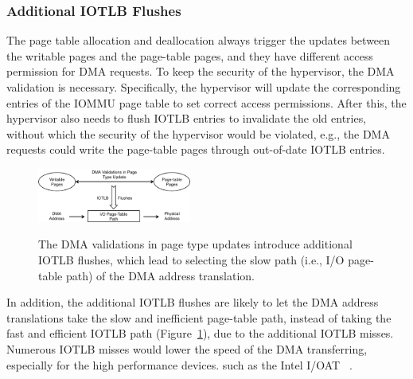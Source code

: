 \subsubsection{Additional IOTLB Flushes}
The page table allocation and deallocation always trigger the updates between the writable pages and the page-table pages, and they have different access permission for DMA requests.
To keep the security of the hypervisor, the DMA validation is necessary.
Specifically, the hypervisor will update the corresponding entries of the IOMMU page table to set correct access permissions.
After this, the hypervisor also needs to flush IOTLB entries to invalidate the old entries, without which the security of the hypervisor would be violated, e.g., the DMA requests could write the page-table pages through out-of-date IOTLB entries.

\begin{figure}[ht]
\centering
\includegraphics[width=0.45\textwidth]{image/background/problem-illustration.png} \\
\caption{The DMA validations in page type updates introduce additional IOTLB flushes, which lead to selecting the slow path  (i.e., I/O page-table path) of the DMA address translation.}
\label{fig:pro-ill}
\end{figure}


In addition, the additional IOTLB flushes are likely to let the DMA address
translations take the slow and inefficient page-table path,
instead of taking the fast and efficient IOTLB path (Figure~\ref{fig:pro-ill}), due to the additional IOTLB misses.
Numerous IOTLB misses would lower the speed of the DMA transferring, especially for the high performance devices. such as the Intel I/OAT ~\cite{lauritzenintel}.




